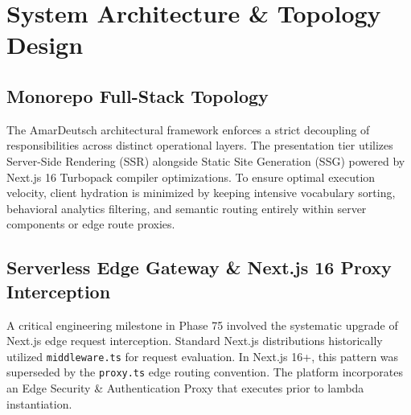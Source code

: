 \documentclass[12pt,a4paper]{article}
\begin{document}
\section{System Architecture \& Topology Design}

\subsection{Monorepo Full-Stack Topology}
The AmarDeutsch architectural framework enforces a strict decoupling of responsibilities across distinct operational layers. The presentation tier utilizes Server-Side Rendering (SSR) alongside Static Site Generation (SSG) powered by Next.js 16 Turbopack compiler optimizations. To ensure optimal execution velocity, client hydration is minimized by keeping intensive vocabulary sorting, behavioral analytics filtering, and semantic routing entirely within server components or edge route proxies.

\subsection{Serverless Edge Gateway \& Next.js 16 Proxy Interception}
A critical engineering milestone in Phase 75 involved the systematic upgrade of Next.js edge request interception. Standard Next.js distributions historically utilized \texttt{middleware.ts} for request evaluation. In Next.js 16+, this pattern was superseded by the \texttt{proxy.ts} edge routing convention. The platform incorporates an Edge Security \& Authentication Proxy that executes prior to lambda instantiation.
\end{document}
